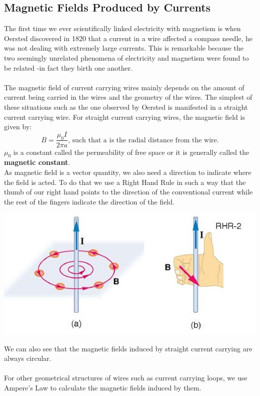 \documentclass[9pt]{article}
\begin{document}
 	 \subsection*{Magnetic Fields Produced by Currents}
 	 The first time we ever scientifically linked electricity with magnetism is when Oersted discovered in 1820 that a current in a wire affected a compass needle, he was not dealing with extremely large currents. This is remarkable because the two seemingly unrelated phenomena of electricity and magnetism were found to be related -in fact they birth one another. \\ \\
	 The magnetic field of current carrying wires mainly depends on the amount of current being carried in the wires and the geometry of the wires. The simplest of these situations such as the one observed by Oersted is manifested in a straight current carrying wire. For straight current carrying wires, the magnetic field is given by:
	 $$B=\dfrac{\mu_0I}{2\pi a}\text{, such that a is the radial distance from the wire.}$$
	 $\mu_0$ is a constant called the permeability of free space or it is generally called the \textbf{magnetic constant}. \\
	 As magnetic field is a vector quantity, we also need a direction to indicate where the field is acted. To do that we use a Right Hand Rule in such a way that the thumb of our right hand points to the direction of the conventional current while the rest of the fingers indicate the direction of the field. 
	 \begin{center}
	 	\includegraphics*[scale=0.6]{rhr.jpg}
	 \end{center}
	 We can also see that the magnetic fields induced by straight current carrying are always circular. \\ \\
	 For other geometrical structures of wires such as current carrying loops, we use Ampere's Law to calculate the magnetic fields induced by them.
\end{document}
